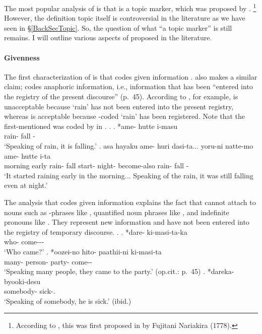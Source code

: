 The most popular analysis of 
is that  is a topic marker,
which was proposed by .%
 \footnote{
 According to ,
 this was first proposed in  by Fujitani Nariakira (1778).
 }
However, the definition topic itself is controversial in the literature
as we have seen in \S \ref{BackSecTopic}.
So, the question of what ``a topic marker'' is still remains.
I will outline various aspects of  proposed in the literature.

\paragraph{Givenness}

The first characterization of  is that
 codes given information
\cite[p.~233]{chafe70}.
 also makes a similar claim;
 codes anaphoric information,
i.e.,
information that has been ``entered into the registry of the
present discourse'' (p.~45).
According to , for example,
\Next[a] is unacceptable because
 `rain' has not been entered into the present registry,
whereas \Next[b] is acceptable because
-coded  `rain' has been registered.
Note that the first-mentioned  was coded by  in \Next[b].
%
\ex.
 \ag. *ame- hutte i-masu \\
       rain- fall - \\
       `Speaking of rain, it is falling.'
 \bg. asa hayaku ame- huri dasi-ta... yoru-ni natte-mo ame- hutte i-ta \\
       morning early rain- fall start- night- become-also rain- fall -\\
       `It started raining early in the morning...
       Speaking of the rain, it was still falling even at night.'
       \hfill{\cite[p.~45]{kuno73}}


The analysis that  codes given information
explains the fact that
 cannot attach to nouns such as -phrases like \Next[a],
quantified noun phrases like \Next[b],
and indefinite pronouns like \Next[c].
They represent new information and have not been entered into the registry of temporary discourse.
%
\ex.
 \ag. *dare- ki-masi-ta-ka \\
       who- come--- \\
       `Who came?'
       \hfill{\cite[p.~37]{kuno73}}
 \bg. *oozei-no hito- paathii-ni ki-masi-ta \\
       many- person- party- come-- \\
       `Speaking many people, they came to the party.'
       \hfill{(op.cit.: p.~45)}
 \bg. *dareka- byooki-desu \\
       somebody- sick-.\\
       `Speaking of somebody, he is sick.'
       \hfill{(ibid.)}


